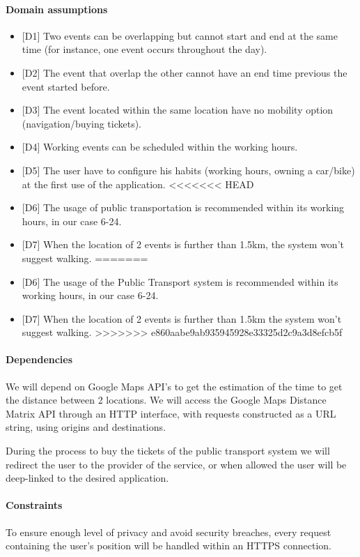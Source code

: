 \paragraph{Domain assumptions}
\begin{itemize}
\item {[D1]} Two events can be overlapping but cannot start and end at the same time (for instance, one event occurs throughout the day).
\item {[D2]} The event that overlap the other cannot have an end time previous the event started before.
\item {[D3]} The event located within the same location have no mobility option (navigation/buying tickets).
\item {[D4]} Working events can be scheduled within the working hours.
\item {[D5]} The user have to configure his habits (working hours, owning a car/bike) at the first use of the application.
<<<<<<< HEAD
\item {[D6]} The usage of public transportation is recommended within its working hours, in our case 6-24.
\item {[D7]} When the location of 2 events is further than 1.5km, the system won't suggest walking.
=======
\item {[D6]} The usage of the Public Transport system is recommended within its working hours, in our case 6-24.
\item {[D7]} When the location of 2 events is further than 1.5km the system won't suggest walking.
>>>>>>> e860aabe9ab935945928e33325d2c9a3d8efcb5f
\end{itemize}

\paragraph{Dependencies}
\begin{description}
\item We will depend on Google Maps API's to get the estimation of the time to get the distance between 2 locations. 
We will access the Google Maps Distance Matrix API through an HTTP interface, with requests constructed as a URL string, using origins and destinations.
\item During the process to buy the tickets of the public transport system we will redirect the user to the provider of the service, or when allowed the user will be deep-linked to the desired application.
\end{description}


\paragraph{Constraints}
\begin{description}
\item To ensure enough level of privacy and avoid security breaches, every request containing the user’s position will be handled within an HTTPS connection.
\end{description}

